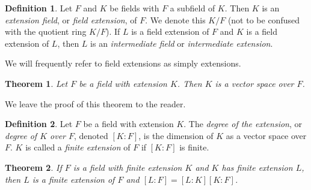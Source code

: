 \documentclass[12pt,leqno]{article}
\numberwithin{equation}{section}
\theoremstyle{plain}
\newtheorem{thm}{Theorem}[section]
\theoremstyle{definition}
\newtheorem*{Def}{Definition}
\theoremstyle{remark}
\begin{document}
\begin{Def}
 Let $F$ and $K$ be fields with $F$ a subfield of $K$. Then $K$ is an \textit{extension field}, or \textit{field extension}, of $F$. We denote this $K/F$ (not to be confused with the quotient ring $K/F$). If $L$ is a field extension of $F$ and $K$ is a field extension of $L$, then $L$ is an \textit{intermediate field} or \textit{intermediate extension}.
\end{Def}

We will frequently refer to field extensions as simply extensions.

\begin{thm}
 Let $F$ be a field with extension $K$. Then $K$ is a vector space over $F$.
\end{thm}

We leave the proof of this theorem to the reader.

\begin{Def}
 Let $F$ be a field with extension $K$. The \textit{degree of the extension}, or \textit{degree of $K$ over $F$}, denoted $[K:F]$, is the dimension of $K$ as a vector space over $F$. $K$ is called a \textit{finite extension} of $F$ if $[K:F]$ is finite.
\end{Def}

\begin{thm}
 If $F$ is a field with finite extension $K$ and $K$ has finite extension $L$, then $L$ is a finite extension of $F$ and $[L:F]=[L:K][K:F]$.
\end{thm}
\end{document}
